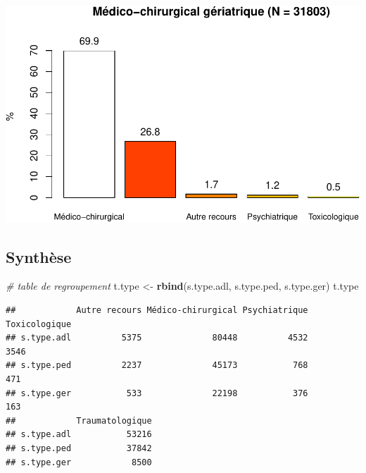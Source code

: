 \documentclass[]{article}
\newenvironment{Shaded}{\begin{snugshade}}{\end{snugshade}}
\newcommand{\KeywordTok}[1]{\textcolor[rgb]{0.13,0.29,0.53}{\textbf{{#1}}}}
\newcommand{\DataTypeTok}[1]{\textcolor[rgb]{0.13,0.29,0.53}{{#1}}}
\newcommand{\FloatTok}[1]{\textcolor[rgb]{0.00,0.00,0.81}{{#1}}}
\newcommand{\StringTok}[1]{\textcolor[rgb]{0.31,0.60,0.02}{{#1}}}
\newcommand{\CommentTok}[1]{\textcolor[rgb]{0.56,0.35,0.01}{\textit{{#1}}}}
\newcommand{\OtherTok}[1]{\textcolor[rgb]{0.56,0.35,0.01}{{#1}}}
\newcommand{\NormalTok}[1]{{#1}}
\begin{document}
\begin{Shaded}
\end{Shaded}

\includegraphics{analyse_merge_files/figure-latex/geriatrie-2.pdf}

\subsection{Synthèse}\label{synthese}

\begin{Shaded}
\begin{Highlighting}[]
\CommentTok{# table de regroupement}
\NormalTok{t.type <-}\StringTok{ }\KeywordTok{rbind}\NormalTok{(s.type.adl, s.type.ped, s.type.ger)}
\NormalTok{t.type}
\end{Highlighting}
\end{Shaded}

\begin{verbatim}
##            Autre recours Médico-chirurgical Psychiatrique Toxicologique
## s.type.adl          5375              80448          4532          3546
## s.type.ped          2237              45173           768           471
## s.type.ger           533              22198           376           163
##            Traumatologique
## s.type.adl           53216
## s.type.ped           37842
## s.type.ger            8500
\end{verbatim}
\end{document}
